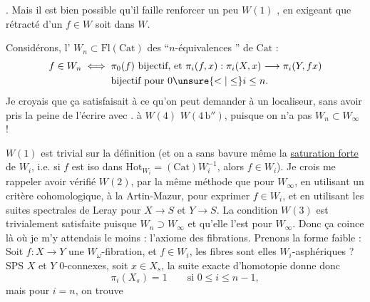 . Mais il est bien possible qu'il faille renforcer un peu $W(1)$ , en exigeant que  rétracté d'un $f\in W$ soit dans $W$.

\uline{} Considérons,  l' $W_n\subset\mathrm{Fl}(\mathrm{Cat})$ des ``$n$-équivalences  '' de $\mathrm{Cat}$ : \[\begin{aligned}f\in W_n\iff{}&\pi_0(f)\text{ bijectif, et }\pi_i(f,x):\pi_i(X,x)\longrightarrow\pi_i(Y,fx)\\ &\text{bijectif pour }0\unsure{<|\leq}i\leq n.\end{aligned}\] Je croyais que ça  satisfaisait à  ce qu'on peut demander à un localiseur, sans avoir pris la peine de l'écrire avec .     à $W(4)$  $W(4\,\mathrm b'')$, puisque on n'a pas $W_n\subset W_\infty$ !

$W(1)$ est trivial sur la définition (et on a sans bavure même la \uline{saturation forte} de $W_i$, i.e. si $f$   est iso dans $\mathrm{Hot}_{W_i}=(\mathrm{Cat})W_i^{-1}$, alors $f\in W_i$). Je crois me rappeler avoir vérifié $W(2)$, par la même méthode que pour $W_\infty$, en utilisant un critère cohomologique, à la Artin-Mazur, pour  exprimer $f\in W_i$, et en utilisant les suites spectrales de Leray pour $X\longrightarrow S$ et $Y\longrightarrow S$. La condition $W(3)$ est trivialement satisfaite puisque $W_n\supset W_\infty$ et qu'elle l'est pour $W_\infty$. Donc ça coince là où je m'y attendais le moins : l'axiome des fibrations. Prenons la forme faible : Soit $f:X\longrightarrow Y$ une $W_\omega$-fibration,  et $f\in W_i$, les fibres sont elles $W_i$-asphériques ? SPS $X$ et $Y$ 0-connexes, soit $x\in X_s$, la suite exacte d'homotopie donne  donc \[\pi_i(X_s)=1\qquad\text{si }0\leq i\leq n-1,\] mais pour $i=n$, on trouve

